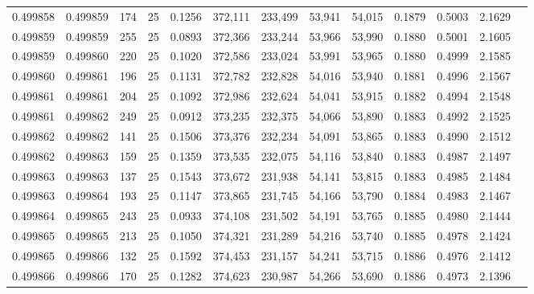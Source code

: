 \begin{tabular}{rrrrrrrrrrrrr}
0.499858 & 0.499859 & 174 &  25 &                                     0.1256 & 372,111 & 233,499 &  53,941 &  54,015 & 0.1879 & 0.5003 & 2.1629 \\
0.499859 & 0.499859 & 255 &  25 &                                     0.0893 & 372,366 & 233,244 &  53,966 &  53,990 & 0.1880 & 0.5001 & 2.1605 \\
0.499859 & 0.499860 & 220 &  25 &                                     0.1020 & 372,586 & 233,024 &  53,991 &  53,965 & 0.1880 & 0.4999 & 2.1585 \\
0.499860 & 0.499861 & 196 &  25 &                                     0.1131 & 372,782 & 232,828 &  54,016 &  53,940 & 0.1881 & 0.4996 & 2.1567 \\
0.499861 & 0.499861 & 204 &  25 &                                     0.1092 & 372,986 & 232,624 &  54,041 &  53,915 & 0.1882 & 0.4994 & 2.1548 \\
0.499861 & 0.499862 & 249 &  25 &                                     0.0912 & 373,235 & 232,375 &  54,066 &  53,890 & 0.1883 & 0.4992 & 2.1525 \\
0.499862 & 0.499862 & 141 &  25 &                                     0.1506 & 373,376 & 232,234 &  54,091 &  53,865 & 0.1883 & 0.4990 & 2.1512 \\
0.499862 & 0.499863 & 159 &  25 &                                     0.1359 & 373,535 & 232,075 &  54,116 &  53,840 & 0.1883 & 0.4987 & 2.1497 \\
0.499863 & 0.499863 & 137 &  25 &                                     0.1543 & 373,672 & 231,938 &  54,141 &  53,815 & 0.1883 & 0.4985 & 2.1484 \\
0.499863 & 0.499864 & 193 &  25 &                                     0.1147 & 373,865 & 231,745 &  54,166 &  53,790 & 0.1884 & 0.4983 & 2.1467 \\
0.499864 & 0.499865 & 243 &  25 &                                     0.0933 & 374,108 & 231,502 &  54,191 &  53,765 & 0.1885 & 0.4980 & 2.1444 \\
0.499865 & 0.499865 & 213 &  25 &                                     0.1050 & 374,321 & 231,289 &  54,216 &  53,740 & 0.1885 & 0.4978 & 2.1424 \\
0.499865 & 0.499866 & 132 &  25 &                                     0.1592 & 374,453 & 231,157 &  54,241 &  53,715 & 0.1886 & 0.4976 & 2.1412 \\
0.499866 & 0.499866 & 170 &  25 &                                     0.1282 & 374,623 & 230,987 &  54,266 &  53,690 & 0.1886 & 0.4973 & 2.1396 \\

\end{tabular}
